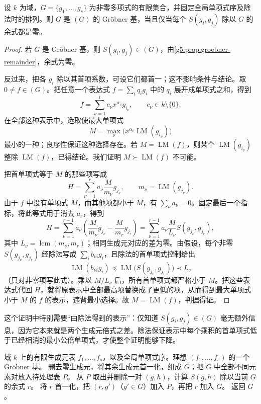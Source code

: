\begin{theorem}[Buchberger 判据]\label{g5:thm:buchberger-criterion}
	设 \(k\) 为域，\(G=\{g_1,\ldots,g_s\}\) 为非零多项式的有限集合，并固定全局单项式序及除法时的排列。则 \(G\) 是 \((G)\) 的 Gröbner 基，当且仅当每个 \(S(g_i,g_j)\) 除以 \(G\) 的余式都是零。
\end{theorem}
\begin{proof}
	若 \(G\) 是 Gröbner 基，则 \(S(g_i,g_j)\in(G)\)，由\cref{g5:prop:groebner-remainder}，余式为零。

	反过来，把各 \(g_i\) 除以其首项系数，可设它们都首一；这不影响条件与结论。取 \(0\ne f\in(G)\)。把任意一个表达式 \(f=\sum_iq_ig_i\) 中的 \(q_i\) 展开成单项式之和，得到
	\[
		f=\sum_{\nu=1}^t c_\nu x^{\alpha_\nu}g_{i_\nu},\qquad c_\nu\in k\setminus\{0\}.
	\]
	在全部这种表示中，选取使最大单项式
	\[
		M=\max_\nu\bigl(x^{\alpha_\nu}\operatorname{LM}(g_{i_\nu})\bigr)
	\]
	最小的一种；良序性保证这种选择存在。若 \(M=\operatorname{LM}(f)\)，则某个 \(\operatorname{LM}(g_{i_\nu})\) 整除 \(\operatorname{LM}(f)\)，已得结论。我们证明 \(M\succ\operatorname{LM}(f)\) 不可能。

	把首单项式等于 \(M\) 的那些项写成
	\[
		H=\sum_{\nu=1}^r a_\nu\frac{M}{m_\nu}g_{j_\nu},
		\qquad m_\nu=\operatorname{LM}(g_{j_\nu}).
	\]
	由于 \(f\) 中没有单项式 \(M\)，而其他项都小于 \(M\)，有 \(\sum_\nu a_\nu=0\)。固定最后一个指标，将此等式用于消去 \(a_r\)，得到
	\[
		H=\sum_{\nu=1}^{r-1}a_\nu
		\left(\frac{M}{m_\nu}g_{j_\nu}-\frac{M}{m_r}g_{j_r}\right)
		=\sum_{\nu=1}^{r-1}a_\nu\frac{M}{L_\nu}S(g_{j_\nu},g_{j_r}),
	\]
	其中 \(L_\nu=\operatorname{lcm}(m_\nu,m_r)\)；相同生成元对应的差为零。由假设，每个非零 \(S(g_{j_\nu},g_{j_r})\) 经除法写成 \(\sum_i b_{\nu i}g_i\)，且除法的首单项式控制给出
	\[
		\operatorname{LM}(b_{\nu i}g_i)
		\preceq\operatorname{LM}\bigl(S(g_{j_\nu},g_{j_r})\bigr)\prec L_\nu
	\]
	（只对非零项写此式）。乘以 \(M/L_\nu\) 后，所有首单项式都严格小于 \(M\)。把这些表达式代回 \(H\)，就将原表示中全部最高项替换成了更低的项，从而得到最大单项式小于 \(M\) 的 \(f\) 的表示，违背最小选择。故 \(M=\operatorname{LM}(f)\)，判据得证。
\end{proof}

这个证明中特别需要“由除法得到的表示”：仅知道 \(S(g_i,g_j)\in(G)\) 毫无额外信息，因为它本来就是两个生成元倍式之差。除法保证表示中每个乘积的首单项式低于已经相消的最小公倍单项式，才使整个证明能够下降。

\begin{algorithm}[htbp]
	\caption{Buchberger 算法}\label{g5:alg:buchberger}
	\begin{algorithmsteps}{域 \(k\) 上的有限生成元表 \(f_1,\ldots,f_s\)，以及全局单项式序。}{理想 \((f_1,\ldots,f_s)\) 的一个 Gröbner 基。}
		\State 删去零生成元，将其余生成元首一化，组成 \(G\)；把 \(G\) 中全部不同元素对放入待处理表 \(P\)。
			\State 从 \(P\) 取出并删除一对 \((g,h)\)，计算 \(S(g,h)\) 除以当前 \(G\) 的余式 \(r\)。
				\State 将 \(r\) 首一化，把 \((r,g')\)（\(g'\in G\)）加入 \(P\)，再把 \(r\) 加入 \(G\)。
			\EndIf
		\EndWhile
		\State 返回 \(G\)。
	\end{algorithmsteps}
\end{algorithm}


